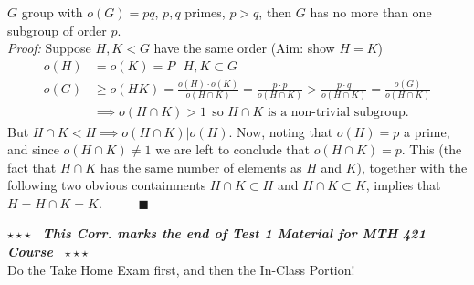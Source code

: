 \newpage
\begin{corollary}
$G$ group with $o(G)=pq$, $p,q$ primes, $p>q$, then $G$ has no more than one subgroup of order $p$. \steezybreak\\
\textit{Proof:} Suppose $H,K<G$ have the same order (Aim: show $H=K$)
\begin{align}
    o(H)&=o(K)=P \ \ \ H,K \subset G \nonumber \\
    o(G)&\geq o(HK) = \frac{o(H)\cdot o(K)}{o(H\cap K)}= \frac{p\cdot p}{o(H\cap K)} > \frac{p\cdot q}{o(H\cap K)} = \frac{o(G)}{o(H\cap K)} \nonumber \\
    &\implies o(H\cap K)>1 \ \ \text{so }H\cap K\text{ is a non-trivial subgroup.} \nonumber
\end{align}
But $H\cap K < H \implies o(H\cap K)|o(H)$. Now, noting that $o(H)=p$ a prime, and since $o(H\cap K)\neq 1$ we are left to conclude that $o(H\cap K)=p$. This (the fact that $H\cap K$ has the same number of elements as $H$ and $K$), together with the following two obvious containments $H\cap K \subset H$ and $H\cap K \subset K$, implies that $H=H\cap K = K$.    \ \ \ \ \ $\blacksquare$
\end{corollary}

\steezybreak
\begin{tcolorbox}
\begin{center}
    $\star\star\star$ \textbf{\textit{~This Corr. marks the end of Test 1 Material for MTH 421 Course~}} $\star\star\star$ \\
    Do the Take Home Exam first, and then the In-Class Portion!
\end{center}
\end{tcolorbox}
\steezybreak
